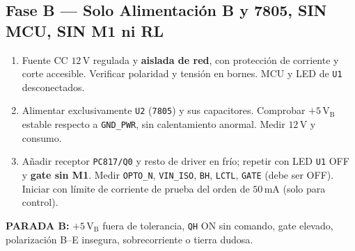 \documentclass[10pt, a4paper, landscape]{article}
\begin{document}
\begin{minipage}[t]{0.49\linewidth}
\subsection*{Fase B — Solo Alimentación B y 7805, SIN MCU, SIN M1 ni RL}
\begin{enumerate}[noitemsep, topsep=2pt]
    \item Fuente CC $12\,\text{V}$ regulada y \textbf{aislada de red}, con protección de corriente y corte accesible. Verificar polaridad y tensión en bornes. MCU y LED de \texttt{U1} desconectados.
    \item Alimentar exclusivamente \texttt{U2} (\texttt{7805}) y sus capacitores. Comprobar $+5\,\text{V}_{\text{B}}$ estable respecto a \texttt{GND\_PWR}, sin calentamiento anormal. Medir $12\,\text{V}$ y consumo.
    \item Añadir receptor \texttt{PC817/Q0} y resto de driver en frío; repetir con LED \texttt{U1} OFF y \textbf{gate sin M1}. Medir \texttt{OPTO\_N}, \texttt{VIN\_ISO}, \texttt{BH}, \texttt{LCTL}, \texttt{GATE} (debe ser OFF). Iniciar con límite de corriente de prueba del orden de $50\,\text{mA}$ (solo para control).
\end{enumerate}
\noindent\textbf{\textcolor{warnred}{PARADA B:}} $+5\,\text{V}_{\text{B}}$ fuera de tolerancia, \texttt{QH} ON sin comando, gate elevado, polarización B--E insegura, sobrecorriente o tierra dudosa.
\end{minipage}\hfill
\end{document}
